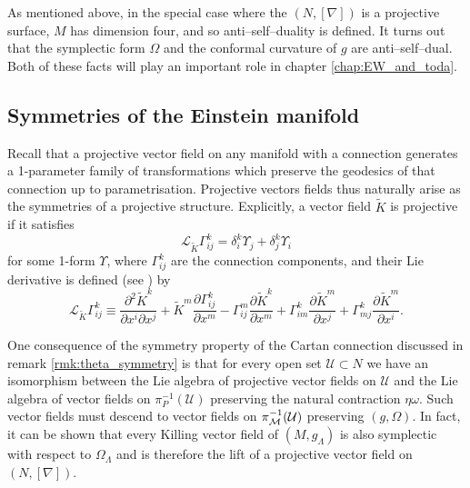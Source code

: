 \begin{rmk}
As mentioned above, in the special case where the $(N,[\nabla])$ is a projective surface, $M$ has dimension four, and so anti--self--duality is defined. It turns out that the symplectic form $\Omega$ and the conformal curvature of $g$ are anti--self--dual. Both of these facts will play an important role in chapter \ref{chap:EW_and_toda}.
\end{rmk}

\subsection{Symmetries of the Einstein manifold}

Recall that a projective vector field on any manifold with a connection
generates a 1-parameter family of transformations which preserve the
geodesics of that connection up to parametrisation. Projective vectors
fields thus naturally arise as the symmetries of a projective structure.
Explicitly, a vector field $\tilde{K}$ is projective if it satisfies
\begin{equation}
\mathcal{L}_{\tilde{K}}\Gamma_{ij}^{k}=\delta_{i}^{k}\Upsilon_{j}+\delta_{j}^{k}\Upsilon_{i}\label{eq:proj_transf}
\end{equation}
for some 1-form $\Upsilon$, where $\Gamma_{ij}^{k}$ are the connection
components, and their Lie derivative is defined (see \cite{yano})
by
\begin{equation}
\mathcal{L}_{\tilde{K}}\Gamma_{ij}^{k}\equiv\frac{\partial^{2}\tilde{K}^{k}}{\partial x^{i}\partial x^{j}}+\tilde{K}^{m}\frac{\partial\Gamma_{ij}^{k}}{\partial x^{m}}-\Gamma_{ij}^{m}\frac{\partial \tilde{K}^{k}}{\partial x^{m}}+\Gamma_{im}^{k}\frac{\partial \tilde{K}^{m}}{\partial x^{j}}+\Gamma_{mj}^{k}\frac{\partial \tilde{K}^{m}}{\partial x^{i}}.\label{eq:liederivGamma}
\end{equation}


One consequence of the symmetry property of the Cartan connection discussed in remark \ref{rmk:theta_symmetry} is that for every open set $\mathcal{U}\subset N$ we have an isomorphism between the Lie algebra of projective vector fields on $\mathcal{U}$ and the Lie algebra of vector fields on $\pi_P^{-1}(\mathcal{U})$ preserving the natural contraction $\eta\omega$. Such vector fields must descend to vector fields on $\pi_{\mathcal{M}}^{-1}(\mathcal{U})$ preserving $(g,\Omega)$. In fact, it can be shown that every Killing vector field of $(M,g_\Lambda)$ is also symplectic with respect to $\Omega_\Lambda$ and is therefore the lift of a projective vector field on $(N,[\nabla])$.

